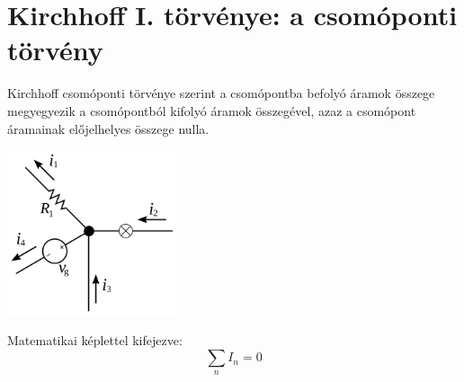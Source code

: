 \documentclass{article}
\begin{document}
\section{Kirchhoff I. törvénye: a csomóponti törvény}
Kirchhoff csomóponti törvénye szerint a csomópontba befolyó áramok összege megyegyezik a csomópontból kifolyó áramok összegével, azaz a csomópont áramainak előjelhelyes összege nulla. \cite{kirchhoff1}

\includegraphics[width=5cm, center]{kirchoff1}

Matematikai képlettel kifejezve:
\begin{equation}
    \sum_{n} I_n = 0
\end{equation}
\end{document}
